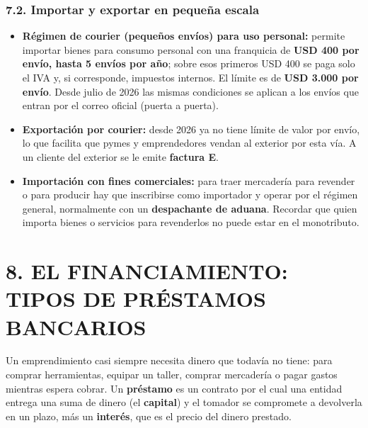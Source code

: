 \subsubsection*{7.2. Importar y exportar en pequeña escala}
\begin{itemize}
  \item \textbf{Régimen de courier (pequeños envíos) para uso personal:} permite importar
        bienes para consumo personal con una franquicia de \textbf{USD 400 por envío, hasta
        5 envíos por año}; sobre esos primeros USD 400 se paga solo el IVA y, si
        corresponde, impuestos internos. El límite es de \textbf{USD 3.000 por envío}. Desde
        julio de 2026 las mismas condiciones se aplican a los envíos que entran por el
        correo oficial (puerta a puerta).
  \item \textbf{Exportación por courier:} desde 2026 ya no tiene límite de valor por envío,
        lo que facilita que pymes y emprendedores vendan al exterior por esta vía.
        A un cliente del exterior se le emite \textbf{factura E}.
  \item \textbf{Importación con fines comerciales:} para traer mercadería para revender o
        para producir hay que inscribirse como importador y operar por el régimen general,
        normalmente con un \textbf{despachante de aduana}. Recordar que quien importa bienes
        o servicios para revenderlos no puede estar en el monotributo.
\end{itemize}

\section*{8. EL FINANCIAMIENTO: TIPOS DE PRÉSTAMOS BANCARIOS}

Un emprendimiento casi siempre necesita dinero que todavía no tiene: para comprar
herramientas, equipar un taller, comprar mercadería o pagar gastos mientras espera
cobrar. Un \textbf{préstamo} es un contrato por el cual una entidad entrega una suma de
dinero (el \textbf{capital}) y el tomador se compromete a devolverla en un plazo, más un
\textbf{interés}, que es el precio del dinero prestado.

